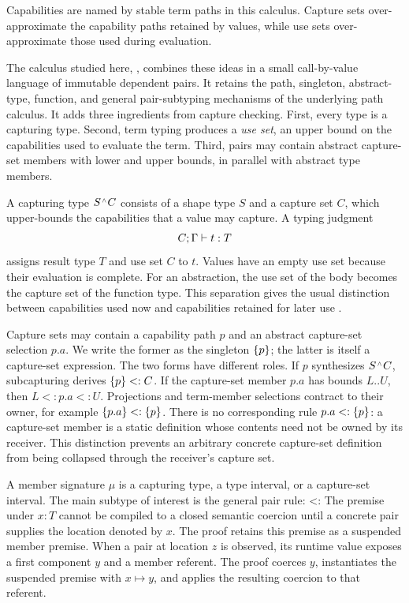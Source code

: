 \documentclass[acmsmall,screen,nonacm]{acmart}
\begin{document}
Capabilities are named by stable term paths in this calculus. Capture sets
over-approximate the capability paths retained by values, while use sets
over-approximate those used during evaluation.

The calculus studied here, \lambdapcc{}, combines these ideas in a small
call-by-value language of immutable dependent pairs. It retains the path,
singleton, abstract-type, function, and general pair-subtyping mechanisms of
the underlying path calculus. It adds three ingredients from capture
checking. First, every type is a capturing type.
Second, term typing produces a \emph{use set}, an upper bound on the
capabilities used to evaluate the term. Third, pairs may contain abstract
capture-set members with lower and upper bounds, in parallel with abstract
type members.

A capturing type \(S\capt C\) consists of a shape type \(S\) and a capture
set \(C\), which upper-bounds the capabilities that a value may capture. A typing
judgment
\[
  {C}; {\Gamma}\vdash {t} : {T}
\]
assigns result type \(T\) and use set \(C\) to \(t\). Values have an empty
use set because their evaluation is complete. For an abstraction, the use set
of the body becomes the capture set of the function type. This separation gives the usual distinction
between capabilities used now and capabilities retained for later use
\citep{xu2025box,boruch2023capture}.

Capture sets may contain a capability path \(p\) and an abstract capture-set
selection \(p.a\). We write the former as the singleton \(\{{p}\}\); the
latter is itself a capture-set expression. The two forms have different
roles. If \(p\) synthesizes \(S\capt C\), subcapturing derives
\(\{{p}\}<:C\). If the capture-set member \(p.a\) has bounds \(L..U\), then
\(L<:p.a<:U\). Projections and term-member selections contract to their
owner, for example \(\{{p.a}\}<:\{{p}\}\). There is no corresponding rule
\(p.a<:\{{p}\}\): a capture-set member is a static definition whose contents
need not be owned by its receiver. This distinction prevents an arbitrary
concrete capture-set definition from being collapsed through the receiver's
capture set.

A member signature \(\mu\) is a capturing type, a type interval, or a
capture-set interval. The main subtype of interest is the general pair rule:
\begingroup
{}
{}
  {\Gamma\vdash
    <:
    }
\endgroup
The premise under \(x:T\) cannot be compiled to a closed semantic
coercion until a concrete pair supplies the location denoted by \(x\).
The proof retains this premise as a suspended member premise. When a pair at location
\(z\) is observed, its runtime value exposes a first component \(y\) and a
member referent. The proof coerces \(y\), instantiates the suspended premise with
\(x\mapsto y\), and applies the resulting coercion to that referent.
\end{document}
